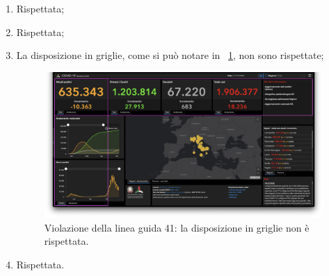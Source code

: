 \begin{enumerate}
    \item Rispettata;
    \item Rispettata;
    \item La disposizione in griglie, come si può notare in  ~\ref{fig:guidelines-violations-15}, non sono rispettate;
        \begin{figure}[H]
            \centering
            \includegraphics[width=0.5\columnwidth]{../../../assets/images/verifica-risorse-esistenti/guidelines_violations_17.png}
            \caption{Violazione della linea guida 41: la disposizione in griglie non è rispettata.}
            \label{fig:guidelines-violations-15}
        \end{figure}
    \item Rispettata.
\end{enumerate}
